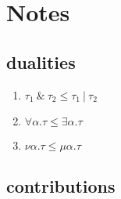 \documentclass[sigplan,screen]{acmart}
\begin{document}
\section*{Notes}

\subsection*{dualities}
\begin{enumerate}
  \item \(\tau_1\ \&\ \tau_2  \leq \tau_1\ |\ \tau_2 \)
  \item \(\forall \alpha . \tau \leq \exists \alpha . \tau \)
  \item \(\nu \alpha . \tau \leq \mu \alpha . \tau \)
\end{enumerate}

\subsection*{contributions}
\end{document}
